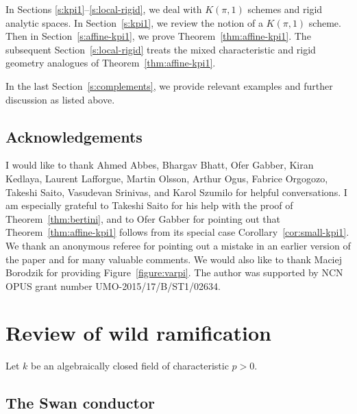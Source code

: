 \documentclass[twoside]{amsart}
\theoremstyle{plain}
\theoremstyle{definition}
\theoremstyle{remark}
\numberwithin{equation}{subsection}
\begin{document}
In Sections \ref{s:kpi1}--\ref{s:local-rigid}, we deal with $K(\pi, 1)$ schemes and rigid analytic spaces. In Section~\ref{s:kpi1}, we review the notion of a $K(\pi, 1)$ scheme. Then in Section~\ref{s:affine-kpi1}, we prove Theorem~\ref{thm:affine-kpi1}. The subsequent Section~\ref{s:local-rigid} treats the mixed characteristic and rigid geometry analogues of Theorem~\ref{thm:affine-kpi1}.  

In the last Section~\ref{s:complements}, we provide relevant examples and further discussion as listed above.

\subsection{Acknowledgements}

I would like to thank Ahmed Abbes, Bhargav Bhatt, Ofer Gabber, Kiran Kedlaya, Laurent Lafforgue, Martin Olsson, Arthur Ogus, Fabrice Orgogozo, Takeshi Saito, Vasudevan Srinivas, and Karol Szumilo for helpful conversations. I am especially grateful to Takeshi Saito for his help with the proof of Theorem~\ref{thm:bertini}, and to Ofer Gabber for pointing out that Theorem~\ref{thm:affine-kpi1} follows from its special case Corollary~\ref{cor:small-kpi1}. We thank an anonymous referee for pointing out a mistake in an earlier version of the paper and for many valuable comments. We would also like to thank Maciej Borodzik for providing Figure~\ref{figure:varpi}. The author was supported by NCN OPUS grant number UMO-2015/17/B/ST1/02634.

\setcounter{tocdepth}{1}
\tableofcontents

\section{Review of wild ramification}
\label{s:wild}

Let $k$ be an algebraically closed field of characteristic $p>0$.

\subsection{The Swan conductor} 
\end{document}
